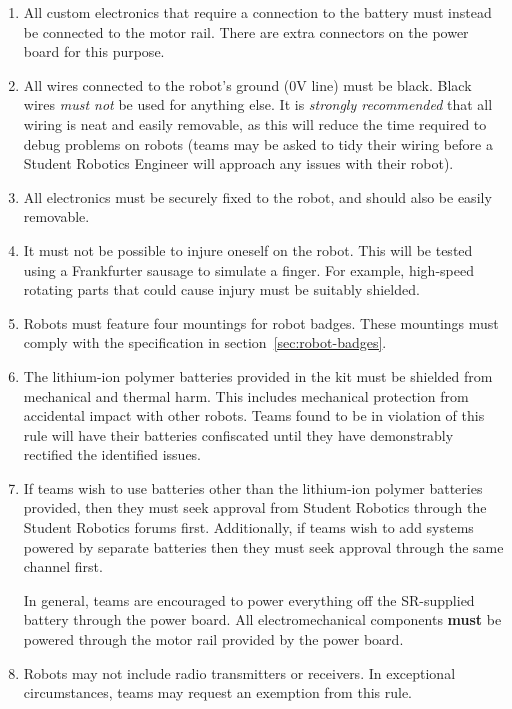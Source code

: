 \begin{enumerate}
\item All custom electronics that require a connection to the battery must instead be connected to the motor rail.
      There are extra connectors on the power board for this purpose.

\item All wires connected to the robot's ground (0V line) must be black.
      Black wires \emph{must not} be used for anything else.
      It is \emph{strongly recommended} that all wiring is neat and easily removable, as this will reduce the time required to debug problems on robots
       (teams may be asked to tidy their wiring before a Student Robotics Engineer will approach any issues with their robot).

\item All electronics must be securely fixed to the robot, and should also be easily removable.

\item It must not be possible to injure oneself on the robot.
      This will be tested using a Frankfurter sausage to simulate a finger.
      For example, high-speed rotating parts that could cause injury must be suitably shielded.

\item Robots must feature four mountings for robot badges.
      These mountings must comply with the specification in section~\ref{sec:robot-badges}.

\item The lithium-ion polymer batteries provided in the kit must be shielded from mechanical and thermal harm.
      This includes mechanical protection from accidental impact with other robots.
      Teams found to be in violation of this rule will have their batteries confiscated until they have demonstrably rectified the identified issues.

\item If teams wish to use batteries other than the lithium-ion polymer batteries provided,
       then they must seek approval from Student Robotics through the Student Robotics forums first.
      Additionally, if teams wish to add systems powered by separate batteries then they must seek approval through the same channel first.

      In general, teams are encouraged to power everything off the SR-supplied battery through the power board.
      All electromechanical components \textbf{must} be powered through the motor rail provided by the power board.

\item Robots may not include radio transmitters or receivers.
      In exceptional circumstances, teams may request an exemption from this rule.

\end{enumerate}
